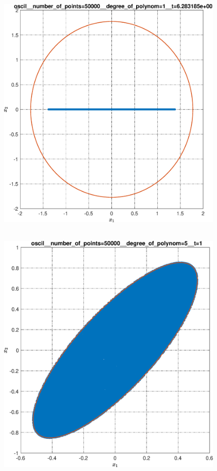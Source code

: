 \documentclass[../main.tex]{subfiles}
\begin{document}
\begin{figure}[ht!]
\begin{minipage}[b]{.3\linewidth}
  	\end{minipage} 
  	\hfill
  	\begin{minipage}[b]{.3\linewidth} 
  		\small
  		\centering
  		\includegraphics[width=\linewidth]{images/oscil__number_of_points=50000__degree_of_polynom=1__t=2pi.eps}
  	\end{minipage} 
  	\vfill
  	\hspace{-2.5ex}
  	\begin{minipage}[b]{.3\linewidth} 
  		\small
  		\centering 
  		\includegraphics[width=\linewidth]{images/oscil__number_of_points=50000__degree_of_polynom=5__t=1.eps}

\end{minipage}
\end{figure}
\end{document}
